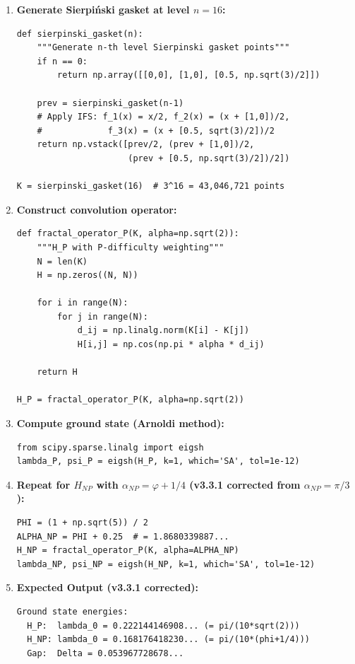 \begin{enumerate}
\item \textbf{Generate Sierpiński gasket at level $n=16$:}
\begin{verbatim}
def sierpinski_gasket(n):
    """Generate n-th level Sierpinski gasket points"""
    if n == 0:
        return np.array([[0,0], [1,0], [0.5, np.sqrt(3)/2]])

    prev = sierpinski_gasket(n-1)
    # Apply IFS: f_1(x) = x/2, f_2(x) = (x + [1,0])/2,
    #             f_3(x) = (x + [0.5, sqrt(3)/2])/2
    return np.vstack([prev/2, (prev + [1,0])/2,
                      (prev + [0.5, np.sqrt(3)/2])/2])

K = sierpinski_gasket(16)  # 3^16 = 43,046,721 points
\end{verbatim}

\item \textbf{Construct convolution operator:}
\begin{verbatim}
def fractal_operator_P(K, alpha=np.sqrt(2)):
    """H_P with P-difficulty weighting"""
    N = len(K)
    H = np.zeros((N, N))

    for i in range(N):
        for j in range(N):
            d_ij = np.linalg.norm(K[i] - K[j])
            H[i,j] = np.cos(np.pi * alpha * d_ij)

    return H

H_P = fractal_operator_P(K, alpha=np.sqrt(2))
\end{verbatim}

\item \textbf{Compute ground state (Arnoldi method):}
\begin{verbatim}
from scipy.sparse.linalg import eigsh
lambda_P, psi_P = eigsh(H_P, k=1, which='SA', tol=1e-12)
\end{verbatim}

\item \textbf{Repeat for $H_{NP}$ with $\alpha_{NP} = \varphi + 1/4$ (v3.3.1 corrected from $\alpha_{NP} = \pi/3$):}
\begin{verbatim}
PHI = (1 + np.sqrt(5)) / 2
ALPHA_NP = PHI + 0.25  # = 1.8680339887...
H_NP = fractal_operator_P(K, alpha=ALPHA_NP)
lambda_NP, psi_NP = eigsh(H_NP, k=1, which='SA', tol=1e-12)
\end{verbatim}

\item \textbf{Expected Output (v3.3.1 corrected):}
\begin{verbatim}
Ground state energies:
  H_P:  lambda_0 = 0.222144146908... (= pi/(10*sqrt(2)))
  H_NP: lambda_0 = 0.168176418230... (= pi/(10*(phi+1/4)))
  Gap:  Delta = 0.053967728678...


\end{verbatim}
\end{enumerate}
